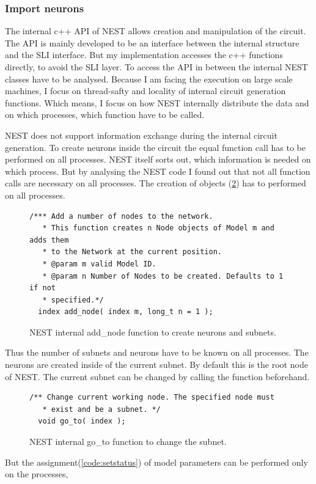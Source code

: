 \subsubsection{Import neurons}
The internal c++ API of NEST allows creation and manipulation of the circuit.
The API is mainly developed to be an interface between the internal structure
and the SLI interface. But my implementation accesses the c++ functions directly,
to avoid the SLI layer. To access the API in between the internal NEST classes
have to be analysed. Because I am facing the execution on large scale machines,
I focus on thread-safty and locality of internal circuit generation functions.
Which means, I focus on how NEST internally distribute the data and on which processes, which
function have to be called.

NEST does not support information exchange during the internal circuit generation. 
To create neurons inside the circuit the equal function call has to be
performed on all processes. NEST itself sorts out, which information is needed on which process.
But by analysing the NEST code I found out that not all function calls are necessary on all processes.
The creation of objects (\ref{code:addnode}) has to performed on all processes.
\begin{figure}[ht!]
\begin{lstlisting}[style=cppcode]
/*** Add a number of nodes to the network.
   * This function creates n Node objects of Model m and adds them
   * to the Network at the current position.
   * @param m valid Model ID.
   * @param n Number of Nodes to be created. Defaults to 1 if not
   * specified.*/
  index add_node( index m, long_t n = 1 );
\end{lstlisting}
\caption{NEST internal add\_{}node function to create neurons and subnets.}
\label{code:addnode}
\end{figure}
Thus the number of subnets and neurons have to be known on all processes.
The neurons are created inside of the current subnet.
By default this is the root node of NEST.
The current subnet can be changed by calling the function beforehand.
\begin{figure}[ht!]
\begin{lstlisting}[style=cppcode]
/** Change current working node. The specified node must
   * exist and be a subnet. */
  void go_to( index );
\end{lstlisting}
\caption{NEST internal go\_{}to function to change the subnet.}
\label{code:addnode}
\end{figure}
But the assignment(\ref{code:setstatus}) of model parameters can be performed only on the processes,
